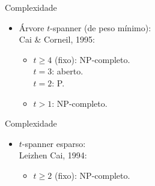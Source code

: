 \documentclass[dvipsnames]{beamer}
\begin{document}
\begin{frame}{Complexidade}
  \begin{itemize}
  \item Árvore $t$-spanner (de peso mínimo):\\
      Cai \& Corneil, 1995:\\
      \begin{itemize}
      \item {$t \ge 4$ (fixo): NP-completo.}\\
          {\makebox[3.3cm]{\hfill}$t = 3$: aberto.}\\                
          {\makebox[3.3cm]{\hfill}$t = 2$: P.}\\
        \item {$t > 1$: NP-completo.}\\
      \end{itemize}
  \end{itemize}
\end{frame}

\begin{frame}{Complexidade}
  \begin{itemize}
  \item $t$-spanner esparso:\\
    Leizhen Cai, 1994:\\
    \begin{itemize}
    \item {$t \ge 2$ (fixo): NP-completo.}\\
    \end{itemize}
  \end{itemize}
\end{frame}
\end{document}
